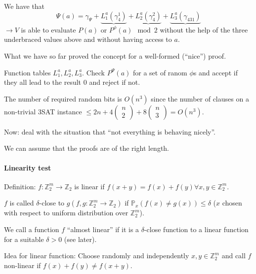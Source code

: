 \documentclass[11pt]{article}
\theoremstyle{definition}
\theoremstyle{definition}
\begin{document}
\begin{enumerate}
	We have that
	\[ \Psi(a) = \gamma_{\Psi} + \underbrace{L_1^a (\gamma_4^1)} + \underbrace{L_2^a (\gamma_4^2)} + \underbrace{L_3^a (\gamma_431)} \]
	$ \rightarrow V $ is able to evaluate $ P(a) $ or $ P^{\phi}(a) \mod 2 $ without the help of the three underbraced values above and without having access to $ a $.
	
	What we have so far proved the concept for a well-formed (``nice'') proof.
	
	Function tables $ L_1^a, L_2^a, L_3^a $.
	Check $ P^{\Psi}(a) $ for a set of ranom $ \phi$s and accept if they all lead to the result 0 and reject if not.
	
	The number of required random bits is $ O(n^3) $ since the number of clauses on a non-trivial 3SAT instance $ \leq 2n + 4 \begin{pmatrix}n \\ 2 \end{pmatrix} + 8 \begin{pmatrix}n \\ 3 \end{pmatrix} = O(n^3) $.
\end{enumerate} \bigskip
	
Now: deal with the situation that ``not everything is behaving nicely''.
	
We can assume that the proofs are of the right length.
	

	
\paragraph{Linearity test}
Definition: $ f : \mathbb{Z}_2^m \rightarrow \mathbb{Z}_2 $ is linear if $ f(x + y) = f(x) + f(y) \forall x, y \in \mathbb{Z}_2^m. $

$ f $ is called $ \delta $-close to $ g (f, g: \mathbb{Z}_2^m \rightarrow \mathbb{Z}_2)$ if $ \mathbb{P}_x(f(x) \neq g(x))\leq \delta $ ($ x $ chosen with respect to uniform distribution over  $\mathbb{Z}_2^m$).

We call a function $ f $ ``almost linear'' if it is a $ \delta $-close function to a linear function for a suitable $ \delta > 0 $ (see later).

Idea for linear function: Choose randomly and independently $ x, y \in \mathbb{Z}_2^m $ and call $ f $ non-linear if $ f(x) + f(y) \neq f(x + y) $.
\end{document}

